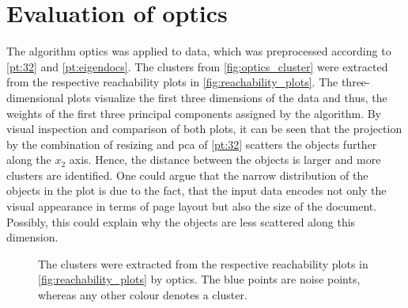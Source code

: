 \section{Evaluation of \acs{optics}}\label{sec:evaluation-OPTICS}
The algorithm \ac{optics} was applied to data, which was preprocessed according to \autoref{pt:32} and \autoref{pt:eigendocs}.
The clusters from \autoref{fig:optics_cluster} were extracted from the respective reachability plots in \autoref{fig:reachability_plots}.
The three-dimensional plots visualize the first three dimensions of the data and thus, the weights of the first three principal components assigned by the \eigendocs{} algorithm.
By visual inspection and comparison of both plots, it can be seen that the projection by the combination of resizing and \ac{pca} of \autoref{pt:32} scatters the objects further along the $x_2$ axis.
Hence, the distance between the objects is larger and more clusters are identified.
One could argue that the narrow distribution of the objects in the \eigendocs{} plot is due to the fact, 
that the input data encodes not only the visual appearance in terms of page layout but also the size of the document.
Possibly, this could explain why the objects are less scattered along this dimension.

\begin{figure}%
    \centering
    \qquad
    \caption{The clusters were extracted from the respective reachability plots in \autoref{fig:reachability_plots} by \ac{optics}.
    The blue points are noise points, whereas any other colour denotes a cluster.}%
    \label{fig:optics_cluster}%
\end{figure}




